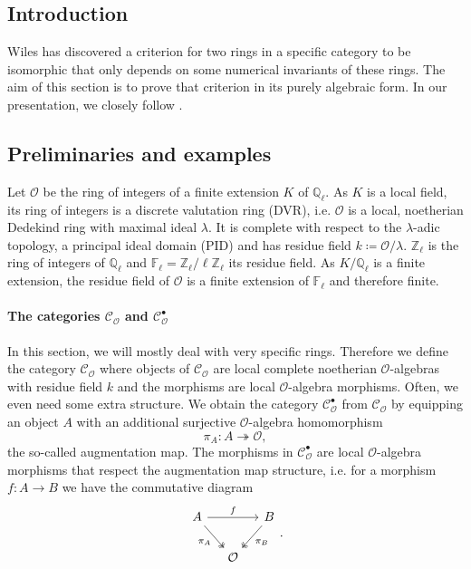 \documentclass{article}
\theoremstyle{plain}%
\theoremstyle{definition}
\theoremstyle{remark}
\newcommand{\cob}{\mathcal{C}_\mathcal{O}^\bullet}
\newcommand{\co}{\mathcal{C}_\mathcal{O}}
\begin{document}
\subsection{Introduction}
Wiles has discovered a criterion for two rings in a specific category to be isomorphic 
that only depends on some numerical invariants of these rings. 
The aim of this section is to prove that criterion in its purely algebraic form. 
In our presentation, we closely follow \cite[sections 5.1 - 5.8]{Darmon1995}.

\subsection{Preliminaries and examples}
Let \(\mathcal{O}\) be the ring of integers of a finite extension \(K\) of \(\mathbb Q_\ell\). 
As \(K\) is a local field, its ring of integers is a discrete valutation ring (DVR), i.e. 
\(\mathcal O\) is a local, noetherian Dedekind ring with maximal ideal \(\lambda\). 
It is complete with respect to the \(\lambda\)-adic topology, a principal ideal domain (PID) 
and has residue field \(k \coloneqq \mathcal{O}/\lambda\).
\(\mathbb Z_\ell\) is the ring of integers of \(\mathbb Q_\ell\) and 
\(\mathbb F_\ell = \mathbb Z_\ell/\ell \mathbb Z_\ell\) its residue field. 
As \(K/\mathbb{Q}_\ell\) is a finite extension, the residue field of \(\mathcal{O}\) 
is a finite extension of $\mathbb F_\ell$ and therefore finite.

\paragraph{The categories \(\co\) and \(\cob\)}
In this section, we will mostly deal with very specific rings. 
Therefore we define the category \(\co\) where objects of \(\co\) are local complete noetherian \(\mathcal O\)-algebras 
with residue field \(k\) and the morphisms are local \(\mathcal{O}\)-algebra morphisms.
Often, we even need some extra structure. 
We obtain the category \(\cob\) from \(\co\) by equipping an object \(A\) 
with an additional surjective \(\mathcal{O}\)-algebra homomorphism
\[\pi_A \colon A \twoheadrightarrow \mathcal{O},\]
the so-called augmentation map. The morphisms in \(\cob\) are local \(\mathcal{O}\)-algebra morphisms 
that respect the augmentation map structure, 
i.e. for a morphism \(f \colon A \to B\) we have the commutative diagram
\[
\begin{tikzcd}[column sep=small]
    A \arrow[rr, "f"] \arrow [dr, "\pi_A", swap, twoheadrightarrow] & & B \arrow [dl, "\pi_B", twoheadrightarrow]\\
    & \mathcal{O} &
\end{tikzcd}.
\]
\end{document}
